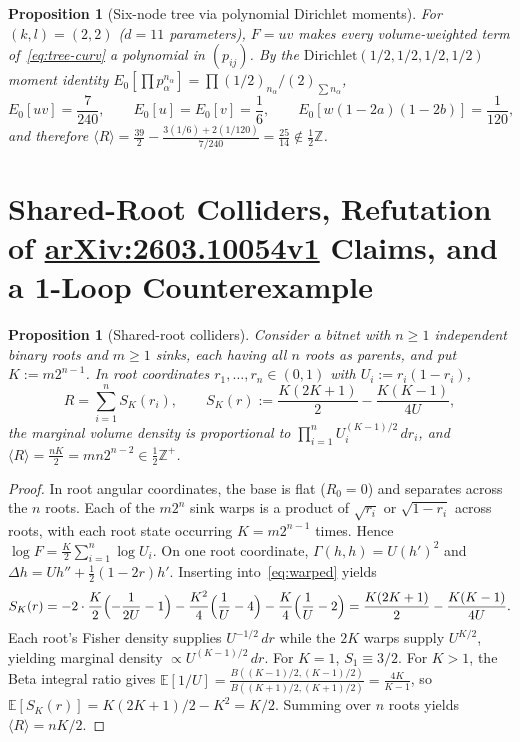 \documentclass[11pt]{article}
\theoremstyle{plain}
\newtheorem{proposition}[theorem]{Proposition}
\theoremstyle{definition}
\theoremstyle{remark}
\begin{document}
\begin{proposition}[Six-node tree via polynomial Dirichlet moments]\label{prop:six-node}
For $(k, l) = (2, 2)$ ($d = 11$ parameters), $F = uv$ makes every volume-weighted term of~\eqref{eq:tree-curv} a polynomial in $(p_{ij})$. By the $\mathrm{Dirichlet}(1/2,1/2,1/2,1/2)$ moment identity $E_0[\prod p_\alpha^{n_\alpha}] = \prod (1/2)_{n_\alpha}/(2)_{\sum n_\alpha}$,
\[
E_0[uv] = \frac{7}{240}, \qquad E_0[u] = E_0[v] = \frac{1}{6}, \qquad E_0[w(1-2a)(1-2b)] = \frac{1}{120},
\]
and therefore $\langle R \rangle = \frac{39}{2} - \frac{3(1/6) + 2(1/120)}{7/240} = \frac{25}{14} \notin \frac{1}{2}\mathbb{Z}$.
\end{proposition}

\section{Shared-Root Colliders, Refutation of \texorpdfstring{\href{https://arxiv.org/abs/2603.10054v1}{arXiv:2603.10054v1}}{arXiv:2603.10054v1} Claims, and a 1-Loop Counterexample}

\begin{proposition}[Shared-root colliders]\label{prop:shared}
Consider a bitnet with $n \ge 1$ independent binary roots and $m \ge 1$ sinks, each having all $n$ roots as parents, and put $K := m 2^{n-1}$. In root coordinates $r_1, \dots, r_n \in (0, 1)$ with $U_i := r_i(1-r_i)$,
\begin{equation}\label{eq:shared}
R = \sum_{i=1}^n S_K(r_i), \qquad S_K(r) := \frac{K(2K+1)}{2} - \frac{K(K-1)}{4U},
\end{equation}
the marginal volume density is proportional to $\prod_{i=1}^n U_i^{(K-1)/2}\,dr_i$, and $\langle R \rangle = \frac{nK}{2} = m n 2^{n-2} \in \frac{1}{2}\mathbb{Z}^+$.
\end{proposition}

\begin{proof}
In root angular coordinates, the base is flat ($R_0 = 0$) and separates across the $n$ roots. Each of the $m 2^n$ sink warps is a product of $\sqrt{r_i}$ or $\sqrt{1-r_i}$ across roots, with each root state occurring $K = m 2^{n-1}$ times. Hence $\log F = \frac{K}{2}\sum_{i=1}^n \log U_i$. On one root coordinate, $\Gamma(h, h) = U(h')^2$ and $\Delta h = U h'' + \frac{1}{2}(1-2r)h'$. Inserting into~\eqref{eq:warped} yields
\[
S_K(r) = -2\cdot\frac{K}{2}\Bigl(-\frac{1}{2U} - 1\Bigr) - \frac{K^2}{4}\Bigl(\frac{1}{U} - 4\Bigr) - \frac{K}{4}\Bigl(\frac{1}{U} - 2\Bigr)
= \frac{K(2K+1)}{2} - \frac{K(K-1)}{4U}.
\]
Each root's Fisher density supplies $U^{-1/2}\,dr$ while the $2K$ warps supply $U^{K/2}$, yielding marginal density $\propto U^{(K-1)/2}\,dr$. For $K = 1$, $S_1 \equiv 3/2$. For $K > 1$, the Beta integral ratio gives $\mathbb{E}[1/U] = \frac{B((K-1)/2, (K-1)/2)}{B((K+1)/2, (K+1)/2)} = \frac{4K}{K-1}$, so $\mathbb{E}[S_K(r)] = K(2K+1)/2 - K^2 = K/2$. Summing over $n$ roots yields $\langle R \rangle = nK/2$.
\end{proof}
\end{document}
